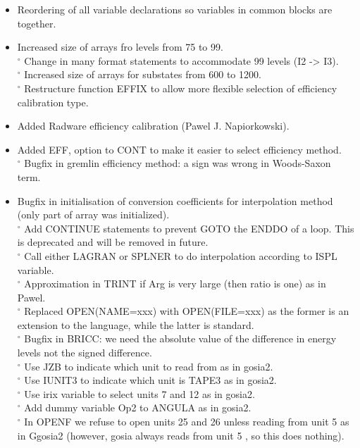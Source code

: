 \documentclass[10pt]{article}
\begin{document}
\begin{itemize}
  \item Reordering of all variable declarations so variables in common blocks are together.
  \item Increased size of arrays fro levels from 75 to 99.\\
${ }^{\circ}$ Change in many format statements to accommodate 99 levels (I2 -> I3).\\
${ }^{\circ}$ Increased size of arrays for substates from 600 to 1200.\\
${ }^{\circ}$ Restructure function EFFIX to allow more flexible selection of efficiency calibration type.
  \item Added Radware efficiency calibration (Pawel J. Napiorkowski).
  \item Added EFF, option to CONT to make it easier to select efficiency method.\\
${ }^{\circ}$ Bugfix in gremlin efficiency method: a sign was wrong in Woods-Saxon term.
  \item Bugfix in initialisation of conversion coefficients for interpolation method (only part of array was initialized).\\
${ }^{\circ}$ Add CONTINUE statements to prevent GOTO the ENDDO of a loop. This is deprecated and will be removed in future.\\
${ }^{\circ}$ Call either LAGRAN or SPLNER to do interpolation according to ISPL variable.\\
${ }^{\circ}$ Approximation in TRINT if Arg is very large (then ratio is one) as in Pawel.\\
${ }^{\circ}$ Replaced OPEN(NAME=xxx) with OPEN(FILE=xxx) as the former is an extension to the language, while the latter is standard.\\
${ }^{\circ}$ Bugfix in BRICC: we need the absolute value of the difference in energy levels not the signed difference.\\
${ }^{\circ}$ Use JZB to indicate which unit to read from as in gosia2.\\
${ }^{\circ}$ Use IUNIT3 to indicate which unit is TAPE3 as in gosia2.\\
${ }^{\circ}$ Use irix variable to select units 7 and 12 as in gosia2.\\
${ }^{\circ}$ Add dummy variable Op2 to ANGULA as in gosia2.\\
${ }^{\circ}$ In OPENF we refuse to open units 25 and 26 unless reading from unit 5 as in Ggosia2 (however, gosia always reads from unit 5 , so this does nothing).

\end{itemize}
\end{document}
